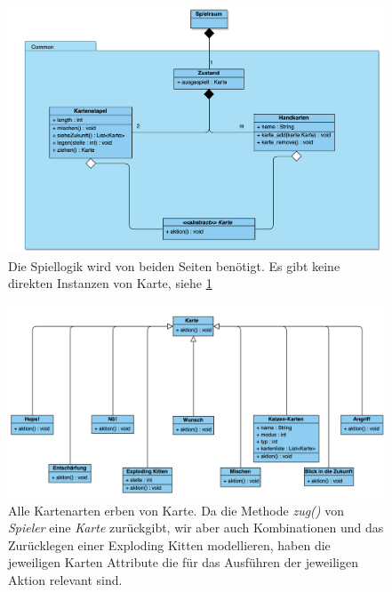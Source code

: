 \documentclass[11pt, a4paper, oneside]{memoir}                                                      %
\begin{document}
        \begin{figure}[h]
			\centering
			\includegraphics[scale=0.45]{../img/Klassen_Diagram/Common.png}
            \caption{Die Spiellogik wird von beiden Seiten benötigt. Es gibt keine direkten Instanzen von Karte, siehe \ref{fig:katze}}
        \end{figure}

        \begin{figure}[h]
			\centering
			\includegraphics[scale=0.45]{../img/Klassen_Diagram/Karten.png}
            \caption{Alle Kartenarten erben von Karte. Da die Methode \textit{zug()} von \textit{Spieler} eine \textit{Karte} zurückgibt, wir aber auch Kombinationen und das Zurücklegen einer Exploding Kitten modellieren,
                haben die jeweiligen Karten Attribute die für das Ausführen der jeweiligen Aktion relevant sind.}
            \label{fig:katze}
        \end{figure}
\end{document}
